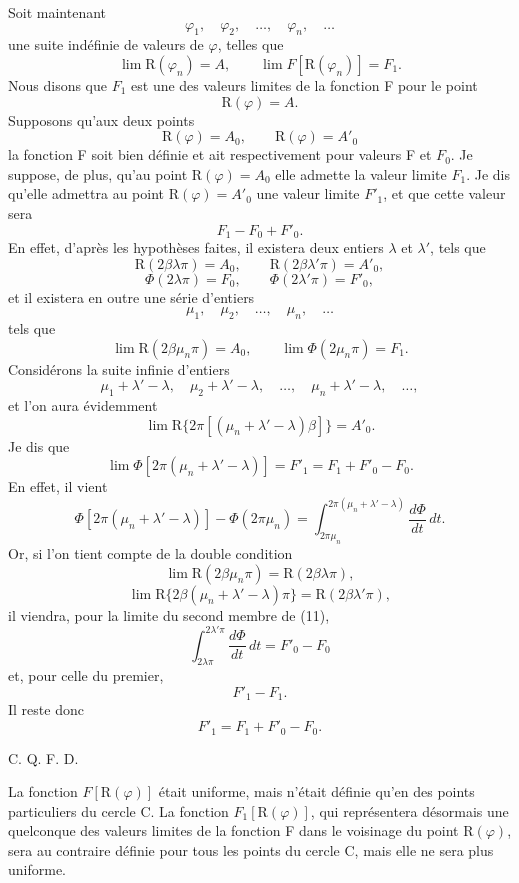 \documentclass[11pt]{article}
\begin{document}
Soit maintenant
\[
\varphi_1,
\quad \varphi_2,
\quad \ldots,
\quad \varphi_n,
\quad \ldots
\]
une suite indéfinie de valeurs de $\varphi$, telles que
\[
\lim \mathrm{R}(\varphi_n)=A,
\qquad
\lim F[\mathrm{R}(\varphi_n)]=F_1.
\]
Nous disons que $F_1$ est une des valeurs limites de la fonction F pour le point
\[
\mathrm{R}(\varphi)=A.
\]
Supposons qu’aux deux points
\[
\mathrm{R}(\varphi)=A_0,
\qquad
\mathrm{R}(\varphi)=A'_0
\]
la fonction F soit bien définie et ait respectivement pour valeurs F et $F_0$. Je suppose, de plus, qu’au point $\mathrm{R}(\varphi)=A_0$ elle admette la valeur limite $F_1$. Je dis qu’elle admettra au point $\mathrm{R}(\varphi)=A'_0$ une valeur limite $F'_1$, et que cette valeur sera
\[
F_1-F_0+F'_0.
\]
En effet, d’après les hypothèses faites, il existera deux entiers $\lambda$ et $\lambda'$, tels que
\[
\mathrm{R}(2\beta\lambda\pi)=A_0,
\qquad
\mathrm{R}(2\beta\lambda'\pi)=A'_0,
\]
\[
\Phi(2\lambda\pi)=F_0,
\qquad
\Phi(2\lambda'\pi)=F'_0,
\]
et il existera en outre une série d’entiers
\[
\mu_1,
\quad \mu_2,
\quad \ldots,
\quad \mu_n,
\quad \ldots
\]
tels que
\[
\lim \mathrm{R}(2\beta\mu_n\pi)=A_0,
\qquad
\lim \Phi(2\mu_n\pi)=F_1.
\]
Considérons la suite infinie d’entiers
\[
\mu_1+\lambda'-\lambda,
\quad
\mu_2+\lambda'-\lambda,
\quad \ldots,
\quad
\mu_n+\lambda'-\lambda,
\quad \ldots,
\]
et l’on aura évidemment
\[
\lim \mathrm{R}\{2\pi[(\mu_n+\lambda'-\lambda)\beta]\}=A'_0.
\]
Je dis que
\[
\lim\Phi[2\pi(\mu_n+\lambda'-\lambda)]=F'_1=F_1+F'_0-F_0.
\]
En effet, il vient
\begin{equation}
\Phi[2\pi(\mu_n+\lambda'-\lambda)]-\Phi(2\pi\mu_n)
=\int_{2\pi\mu_n}^{2\pi(\mu_n+\lambda'-\lambda)}\frac{d\Phi}{dt}\,dt.
\tag{11}
\end{equation}
Or, si l’on tient compte de la double condition
\[
\lim \mathrm{R}(2\beta\mu_n\pi)=\mathrm{R}(2\beta\lambda\pi),
\]
\[
\lim \mathrm{R}\{2\beta(\mu_n+\lambda'-\lambda)\pi\}=\mathrm{R}(2\beta\lambda'\pi),
\]
il viendra, pour la limite du second membre de (11),
\[
\int_{2\lambda\pi}^{2\lambda'\pi}\frac{d\Phi}{dt}\,dt=F'_0-F_0
\]
et, pour celle du premier,
\[
F'_1-F_1.
\]
Il reste donc
\[
F'_1=F_1+F'_0-F_0.
\]
\begin{flushright}C. Q. F. D.\end{flushright}

La fonction $F[\mathrm{R}(\varphi)]$ était uniforme, mais n’était définie qu’en des points particuliers du cercle C. La fonction $F_1[\mathrm{R}(\varphi)]$, qui représentera désormais une quelconque des valeurs limites de la fonction F dans le voisinage du point $\mathrm{R}(\varphi)$, sera au contraire définie pour tous les points du cercle C, mais elle ne sera plus uniforme.
\end{document}
